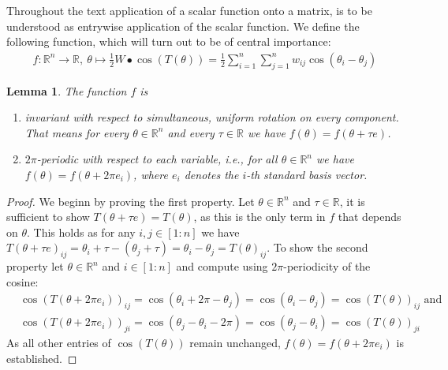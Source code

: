 \documentclass[12pt,a4paper]{article}
\theoremstyle{mythm}
\newtheorem{lem}[thm]{Lemma}
\begin{document}
Throughout the text application of a scalar function onto a matrix, is to be understood as entrywise application of the scalar function.
We define the following function, which will turn out to be of central importance:
\begin{align*}
f : \mathbb{R} ^{ n }  \to \mathbb{R}  , \ \theta \mapsto \frac{ 1 }{ 2 } W \bullet \cos( T(\theta) ) = \frac{ 1 }{ 2 } \sum_{ i = 1 }^{ n } \sum_{ j = 1 }^{ n } w _{ ij }
\cos( \theta _{ i } - \theta _{ j }  ) 
\end{align*} 
\begin{lem}
\label{prop:propertiesf} 
The function $ f $ is 
\begin{enumerate}
\item 
invariant with respect to simultaneous, uniform rotation on every component. That means for every $ \theta \in \mathbb{R} ^{ n }  $ and every  $ \tau \in \mathbb{R}  $ we have $ f (\theta) = f (\theta + \tau e) $.
\item $ 2 \pi  $-periodic with respect to each variable, i.e., for all $ \theta \in \mathbb{R} ^{ n }  $ we have $ f ( \theta ) = f ( \theta + 2 \pi e_i)  $, where $ e_i $
denotes the $ i $-th standard basis vector.
\end{enumerate}
\end{lem} 
\begin{proof}
We beginn by proving the first property. Let $ \theta \in \mathbb{R} ^{ n }  $ and $ \tau \in \mathbb{R}  $, it is sufficient to show $ T ( \theta + \tau e) = T ( \theta) $,
as this is the only term in $ f $ that depends on $ \theta $.
This holds as for any $ i,j \in \left[ 1:n \right]  $ we have $T ( \theta + \tau e) _{ ij } =  \theta _{ i } + \tau - ( \theta _{ j } + \tau ) = \theta _{ i } - \theta _{ j } = T(
\theta) _{ ij }  $.
To show the second property let $ \theta \in \mathbb{R} ^{ n }  $ and $ i \in \left[ 1:n \right]  $ and compute using $ 2 \pi  $-periodicity of the cosine:
\begin{align*}
&\cos(   T ( \theta + 2 \pi e_i) )_{ ij } =  \cos( \theta_i + 2 \pi - \theta_j ) = \cos( \theta_i - \theta_j ) = \cos( T (\theta) ) _{ ij } \text{ and} \\
&\cos(   T ( \theta + 2 \pi e_i) )_{ ji } =  \cos( \theta_j - \theta_i - 2 \pi ) = \cos( \theta_j - \theta_i ) = \cos( T (\theta) ) _{ ji }
\end{align*} 
As all other entries of $ \cos( T(\theta) )   $ remain unchanged, $ f(\theta) = f(\theta+2\pi e_i) $ is established.
\end{proof}
\end{document}
